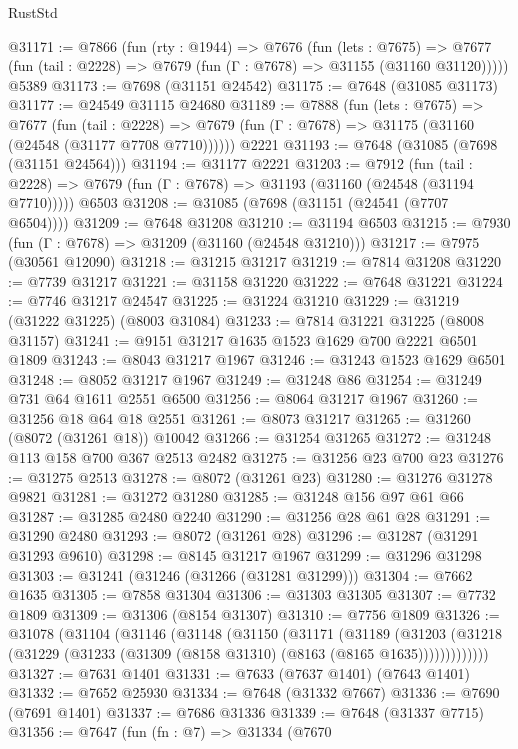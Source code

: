 \begin{lexlean}{RustStd}
\begin{coremodule}
@31171 := @7866
    (fun (rty : @1944) =>
    @7676
      (fun (lets : @7675) =>
      @7677 (fun (tail : @2228) => @7679 (fun (Γ : @7678) => @31155 (@31160 @31120)))))
    @5389
@31173 := @7698 (@31151 @24542)
@31175 := @7648 (@31085 @31173)
@31177 := @24549 @31115 @24680
@31189 := @7888
    (fun (lets : @7675) =>
    @7677
      (fun (tail : @2228) =>
      @7679 (fun (Γ : @7678) => @31175 (@31160 (@24548 (@31177 @7708 @7710))))))
    @2221
@31193 := @7648 (@31085 (@7698 (@31151 @24564)))
@31194 := @31177 @2221
@31203 := @7912
    (fun (tail : @2228) => @7679 (fun (Γ : @7678) => @31193 (@31160 (@24548 (@31194 @7710)))))
    @6503
@31208 := @31085 (@7698 (@31151 (@24541 (@7707 @6504))))
@31209 := @7648 @31208
@31210 := @31194 @6503
@31215 := @7930 (fun (Γ : @7678) => @31209 (@31160 (@24548 @31210)))
@31217 := @7975 (@30561 @12090)
@31218 := @31215 @31217
@31219 := @7814 @31208
@31220 := @7739 @31217
@31221 := @31158 @31220
@31222 := @7648 @31221
@31224 := @7746 @31217 @24547
@31225 := @31224 @31210
@31229 := @31219 (@31222 @31225) (@8003 @31084)
@31233 := @7814 @31221 @31225 (@8008 @31157)
@31241 := @9151 @31217 @1635 @1523 @1629 @700 @2221 @6501 @1809
@31243 := @8043 @31217 @1967
@31246 := @31243 @1523 @1629 @6501
@31248 := @8052 @31217 @1967
@31249 := @31248 @86
@31254 := @31249 @731 @64 @1611 @2551 @6500
@31256 := @8064 @31217 @1967
@31260 := @31256 @18 @64 @18 @2551
@31261 := @8073 @31217
@31265 := @31260 (@8072 (@31261 @18)) @10042
@31266 := @31254 @31265
@31272 := @31248 @113 @158 @700 @367 @2513 @2482
@31275 := @31256 @23 @700 @23
@31276 := @31275 @2513
@31278 := @8072 (@31261 @23)
@31280 := @31276 @31278 @9821
@31281 := @31272 @31280
@31285 := @31248 @156 @97 @61 @66
@31287 := @31285 @2480 @2240
@31290 := @31256 @28 @61 @28
@31291 := @31290 @2480
@31293 := @8072 (@31261 @28)
@31296 := @31287 (@31291 @31293 @9610)
@31298 := @8145 @31217 @1967
@31299 := @31296 @31298
@31303 := @31241 (@31246 (@31266 (@31281 @31299)))
@31304 := @7662 @1635
@31305 := @7858 @31304
@31306 := @31303 @31305
@31307 := @7732 @1809
@31309 := @31306 (@8154 @31307)
@31310 := @7756 @1809
@31326 := @31078
    (@31104
      (@31146
        (@31148
          (@31150
            (@31171
              (@31189
                (@31203
                  (@31218 (@31229 (@31233 (@31309 (@8158 @31310) (@8163 (@8165 @1635)))))))))))))
@31327 := @7631 @1401
@31331 := @7633 (@7637 @1401) (@7643 @1401)
@31332 := @7652 @25930
@31334 := @7648 (@31332 @7667)
@31336 := @7690 (@7691 @1401)
@31337 := @7686 @31336
@31339 := @7648 (@31337 @7715)
@31356 := @7647
    (fun (fn : @7) =>
    @31334
      (@7670

\end{coremodule}
\end{lexlean}
